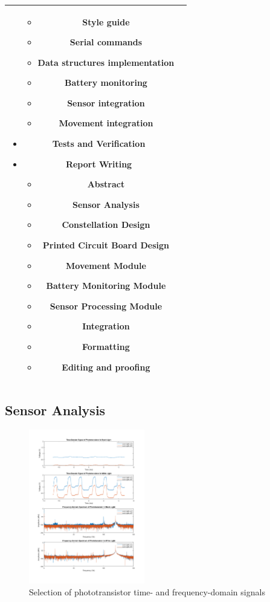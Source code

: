 \documentclass[conference]{IEEEtran}
\begin{document}
\begin{tabularx}{\linewidth}{ | c | X | }
\begin{itemize}
\begin{itemize}
			      \item Style guide
			      \item Serial commands
			      \item Data structures implementation
			      \item Battery monitoring
			      \item Sensor integration
			      \item Movement integration
		      \end{itemize}
		        \item Tests and Verification
		        \item Report Writing
		              \begin{itemize}
			      \item Abstract
			      \item Sensor Analysis
			      \item Constellation Design
			      \item Printed Circuit Board Design
			      \item Movement Module
			      \item Battery Monitoring Module
			      \item Sensor Processing Module
			      \item Integration
			      \item Formatting
			      \item Editing and proofing
		      \end{itemize}
	        \end{itemize} \\
	\hline
\end{tabularx}
\egroup

\subsection{Sensor Analysis}

\begin{figure}[htbp]
	\centerline{\includegraphics[width=0.45\textwidth]{sensor-matlab.png}}
	\caption{Selection of phototransistor time- and frequency-domain signals}
	\label{fig:sensor-matlab}
\end{figure}
\end{document}
